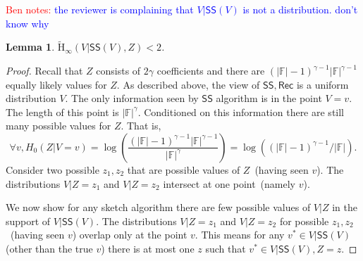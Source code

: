 \documentclass[11pt]{article}
\newcommand{\class}[1]{{\ensuremath{\mathsf{#1}}}}
\newcommand{\sketch}{\ensuremath{\class{SS}}\xspace}
\newcommand{\rec}{\ensuremath{\class{Rec}}\xspace}
\newcommand{\Hav}{\tilde{\mathrm{H}}_\infty}
\newtheorem{lemma}[theorem]{Lemma}
\newcommand{\authnote}[2]{{\textcolor{red}{\textsf{#1 notes: }\textcolor{blue}{ #2}}\marginpar{\textcolor{red}{\textbf{!!!!!}}}}}
\newcommand{\authnote}[2]{}
\newcommand{\bnote}[1]{{\authnote{Ben}{#1}}}
\begin{document}
\bnote{the reviewer is complaining that $V | \sketch(V)$ is not a distribution.  don't know why}
\begin{lemma}
\label{lem:side info determines sketch}
$\Hav(V | \sketch(V), Z) <2$.
\end{lemma}
\begin{proof}
Recall that $Z$ consists of $2\gamma$ coefficients and there are $(|\mathbb{F}|-1)^{\gamma-1} |\mathbb{F}|^{\gamma-1}$ equally likely values for $Z$.
 As described above, the view of $\sketch, \rec$ is a uniform distribution $V$.  %
 The only information seen by $\sketch$ algorithm is in the point $V=v$.  The length of this point is $|\mathbb{F}|^\gamma$.  Conditioned on this information there are still many possible values for $Z$.  That is, 
 \[
 \forall v, H_0(Z | V=v) =\log \left(\frac{(|\mathbb{F}|-1)^{\gamma-1} |\mathbb{F}|^{\gamma-1}}{|\mathbb{F}|^\gamma}\right) = \log \left( (|\mathbb{F}|-1)^{\gamma-1}/|\mathbb{F}|\right).
 \]
Consider two possible $z_1, z_2$ that are possible values of $Z$~(having seen $v$).  The distributions $V| Z=z_1$ and $V | Z=z_2$ intersect at one point~(namely $v$).  

We now show for any sketch algorithm there are few possible values of $V|Z$ in the support of $V |\sketch(V)$.  The distributions $V | Z=z_1$ and $V| Z=z_2$ for possible $z_1, z_2$~(having seen $v$) overlap only at the point $v$.  This means for any $v^*\in V| \sketch(V)$ (other than the true $v$) there is at most one $z$ such that $v^*\in V | \sketch(V), Z=z$.  


\end{proof}
\end{document}
